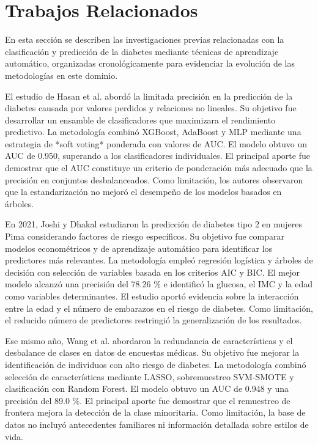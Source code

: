 \documentclass[journal]{IEEEtran}
\begin{document}
\section{Trabajos Relacionados}

En esta sección se describen las investigaciones previas relacionadas con la clasificación y predicción de la diabetes mediante técnicas de aprendizaje automático, organizadas cronológicamente para evidenciar la evolución de las metodologías en este dominio.

El estudio de Hasan et al. \cite{Hasan2020} abordó la limitada precisión en la predicción de la diabetes causada por valores perdidos y relaciones no lineales. Su objetivo fue desarrollar un ensamble de clasificadores que maximizara el rendimiento predictivo. La metodología combinó XGBoost, AdaBoost y MLP mediante una estrategia de *soft voting* ponderada con valores de AUC. El modelo obtuvo un AUC de 0.950, superando a los clasificadores individuales. El principal aporte fue demostrar que el AUC constituye un criterio de ponderación más adecuado que la precisión en conjuntos desbalanceados. Como limitación, los autores observaron que la estandarización no mejoró el desempeño de los modelos basados en árboles.

En 2021, Joshi y Dhakal \cite{Joshi2021} estudiaron la predicción de diabetes tipo 2 en mujeres Pima considerando factores de riesgo específicos. Su objetivo fue comparar modelos econométricos y de aprendizaje automático para identificar los predictores más relevantes. La metodología empleó regresión logística y árboles de decisión con selección de variables basada en los criterios AIC y BIC. El mejor modelo alcanzó una precisión del 78.26 \% e identificó la glucosa, el IMC y la edad como variables determinantes. El estudio aportó evidencia sobre la interacción entre la edad y el número de embarazos en el riesgo de diabetes. Como limitación, el reducido número de predictores restringió la generalización de los resultados.

Ese mismo año, Wang et al. \cite{Wang2021} abordaron la redundancia de características y el desbalance de clases en datos de encuestas médicas. Su objetivo fue mejorar la identificación de individuos con alto riesgo de diabetes. La metodología combinó selección de características mediante LASSO, sobremuestreo SVM-SMOTE y clasificación con Random Forest. El modelo obtuvo un AUC de 0.948 y una precisión del 89.0 \%. El principal aporte fue demostrar que el remuestreo de frontera mejora la detección de la clase minoritaria. Como limitación, la base de datos no incluyó antecedentes familiares ni información detallada sobre estilos de vida.
\end{document}
